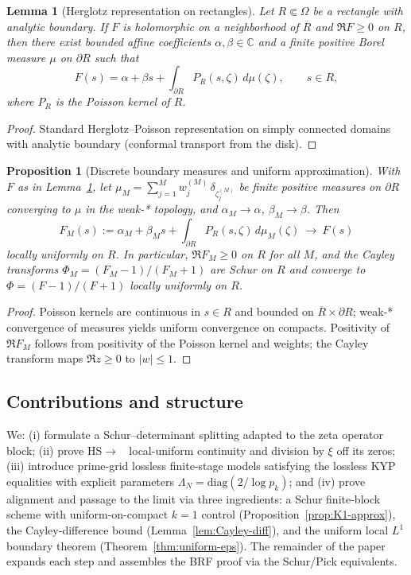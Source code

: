 \documentclass[11pt]{article}
\newtheorem{proposition}[theorem]{Proposition}
\newtheorem{lemma}[theorem]{Lemma}
\theoremstyle{definition}
\theoremstyle{remark}
\newcommand{\C}{\mathbb{C}}
\DeclareMathOperator{\dettwo}{det_2}
\begin{document}
\begin{lemma}[Herglotz representation on rectangles]\label{lem:herglotz-rect}
Let \(R\Subset\Omega\) be a rectangle with analytic boundary. If \(F\) is holomorphic on a neighborhood of \(\overline R\) and \(\Re F\ge 0\) on \(R\), then there exist bounded affine coefficients \(\alpha,\beta\in\C\) and a finite positive Borel measure \(\mu\) on \(\partial R\) such that
\[F(s)=\alpha+\beta s+\int_{\partial R} P_R(s,\zeta)\,d\mu(\zeta),\qquad s\in R,\]
where \(P_R\) is the Poisson kernel of \(R\).
\end{lemma}
\begin{proof}
Standard Herglotz--Poisson representation on simply connected domains with analytic boundary (conformal transport from the disk).
\end{proof}

\begin{proposition}[Discrete boundary measures and uniform approximation]\label{prop:discrete-Poisson}
With \(F\) as in Lemma~\ref{lem:herglotz-rect}, let \(\mu_M=\sum_{j=1}^{M} w_j^{(M)}\,\delta_{\zeta_j^{(M)}}\) be finite positive measures on \(\partial R\) converging to \(\mu\) in the weak-* topology, and \(\alpha_M\to\alpha\), \(\beta_M\to\beta\). Then
\[F_M(s):=\alpha_M+\beta_M s+\int_{\partial R} P_R(s,\zeta)\,d\mu_M(\zeta)\ \to\ F(s)\]
locally uniformly on \(R\). In particular, \(\Re F_M\ge 0\) on \(R\) for all \(M\), and the Cayley transforms \(\Phi_M=(F_M-1)/(F_M+1)\) are Schur on \(R\) and converge to \(\Phi=(F-1)/(F+1)\) locally uniformly on \(R\).
\end{proposition}
\begin{proof}
Poisson kernels are continuous in \(s\in R\) and bounded on \(\overline R\times\partial R\); weak-* convergence of measures yields uniform convergence on compacts. Positivity of \(\Re F_M\) follows from positivity of the Poisson kernel and weights; the Cayley transform maps \(\Re z\ge 0\) to \(|w|\le 1\).
\end{proof}
\subsection*{Contributions and structure}
We: (i) formulate a Schur--determinant splitting adapted to the zeta operator block; (ii) prove HS\(\to\)\(\dettwo\) local-uniform continuity and division by \(\xi\) off its zeros; (iii) introduce prime-grid lossless finite-stage models satisfying the lossless KYP equalities with explicit parameters \(\Lambda_N=\mathrm{diag}(2/\log p_k)\); and (iv) prove alignment and passage to the limit via three ingredients: a Schur finite-block scheme with uniform-on-compact $k=1$ control (Proposition~\ref{prop:K1-approx}), the Cayley-difference bound (Lemma~\ref{lem:Cayley-diff}), and the uniform local \(L^1\) boundary theorem (Theorem~\ref{thm:uniform-eps}). The remainder of the paper expands each step and assembles the BRF proof via the Schur/Pick equivalents.
\end{document}
